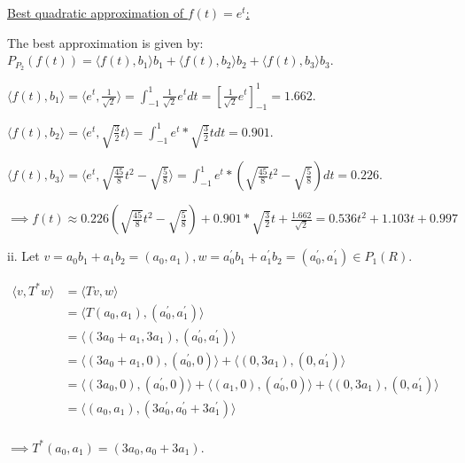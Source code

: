 \documentclass{article}
\begin{document}
\underline{Best quadratic approximation of $f(t)=e^t$:}

The best approximation is given by: 
$P_{P_2}(f(t)) 
= 
\langle f(t), b_1 \rangle b_1
+
\langle f(t), b_2 \rangle b_2
+
\langle f(t), b_3 \rangle b_3
$.
\newline

$\langle f(t), b_1 \rangle
= \langle e^t, \frac{1}{\sqrt{2}} \rangle
= \int_{-1}^{1} \frac{1}{\sqrt{2}} e^t dt
= [\frac{1}{\sqrt{2}} e^t]_{-1}^{1}
= 1.662.
$
\newline

$\langle f(t), b_2 \rangle
= \langle e^t, \sqrt{\frac{3}{2}}t \rangle
= \int_{-1}^{1} e^t * \sqrt{\frac{3}{2}}t dt
= 0.901.
$
\newline

$\langle f(t), b_3 \rangle
= \langle e^t, \sqrt{\frac{45}{8}} t^2 - \sqrt{\frac{5}{8}} \rangle
= \int_{-1}^{1} e^t * (\sqrt{\frac{45}{8}} t^2 - \sqrt{\frac{5}{8}}) dt
= 0.226.
$
\newline

$\implies f(t) 
\approx 
0.226(\sqrt{\frac{45}{8}} t^2 - \sqrt{\frac{5}{8}})
+
0.901 * \sqrt{\frac{3}{2}}t
+
\frac{1.662}{\sqrt{2}}
=
0.536t^2 + 1.103t + 0.997$
\newline


ii. Let $v=a_0b_1 + a_1b_2 = (a_0, a_1), w=a_0^\prime b_1 + a_1^\prime b_2 = (a_0^\prime, a_1^\prime) \in P_1(R)$.

\begin{align*}
  \langle
    v, T^*w
  \rangle
  &=
  \langle
    Tv, w
  \rangle &&\\
  &= 
  \langle
    T(a_0, a_1), (a_0^\prime, a_1^\prime)
  \rangle &&\\
  &= 
  \langle
    (3a_0 + a_1, 3a_1), (a_0^\prime, a_1^\prime)
  \rangle &&\\
  &= 
  \langle
    (3a_0 + a_1, 0), (a_0^\prime, 0)
  \rangle 
  +
  \langle
    (0, 3a_1), (0, a_1^\prime)
  \rangle 
  &&\\
  &= 
  \langle
    (3a_0, 0), (a_0^\prime, 0)
  \rangle 
  +
  \langle
    (a_1, 0), (a_0^\prime, 0)
  \rangle 
  +
  \langle
    (0, 3a_1), (0, a_1^\prime)
  \rangle 
  &&\\
  &= 
  \langle
    (a_0, a_1), (3a_0^\prime, a_0^\prime + 3a_1^\prime)
  \rangle &&\\
\end{align*}

$\implies T^*(a_0, a_1) = (3a_0, a_0 + 3a_1)$.
\newline
\end{document}
